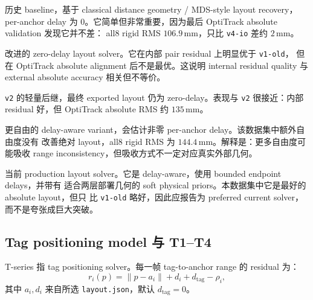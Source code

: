 \documentclass[11pt,a4paper]{article}
\newcommand{\mm}{\,\si{\milli\meter}}
\begin{document}
\begin{description}[leftmargin=2.6em,style=nextline]
  \item[\texttt{v1-old}.]
  历史 baseline，基于 classical distance geometry / MDS-style layout recovery，per-anchor
  delay 为 0。它简单但非常重要，因为最后 OptiTrack absolute validation 发现它并不差：
  all8 rigid RMS $106.9\mm$，只比 \texttt{v4-io} 差约 $2\mm$。

  \item[\texttt{v2}.]
  改进的 zero-delay layout solver。它在内部 pair residual 上明显优于 \texttt{v1-old}，
  但在 OptiTrack absolute alignment 后不是最优。这说明 internal residual quality 与
  external absolute accuracy 相关但不等价。

  \item[\texttt{v3-lite}.]
  \texttt{v2} 的轻量后继，最终 exported layout 仍为 zero-delay。表现与 \texttt{v2}
  很接近：内部 residual 好，但 OptiTrack absolute RMS 约 $135\mm$。

  \item[\texttt{v3-full}.]
  更自由的 delay-aware variant，会估计非零 per-anchor delay。该数据集中额外自由度没有
  改善绝对 layout，all8 rigid RMS 为 $144.4\mm$。解释是：更多自由度可能吸收 range
  inconsistency，但吸收方式不一定对应真实外部几何。

  \item[\texttt{v4-io}.]
  当前 production layout solver。它是 delay-aware，使用 bounded endpoint delays，并带有
  适合两层部署几何的 soft physical priors。本数据集中它是最好的 absolute layout，但只
  比 \texttt{v1-old} 略好，因此应报告为 preferred current solver，而不是夸张成巨大突破。
\end{description}

\subsection{Tag positioning model 与 T1--T4}
\label{sec:tmethod}
T-series 指 tag positioning solver。每一帧 tag-to-anchor range 的 residual 为：
\[
  r_i(p) = \lVert p-a_i\rVert + d_i + d_{\text{tag}} - \rho_i,
\]
其中 $a_i,d_i$ 来自所选 \texttt{layout.json}，默认 $d_{\text{tag}}=0$。
\end{document}
